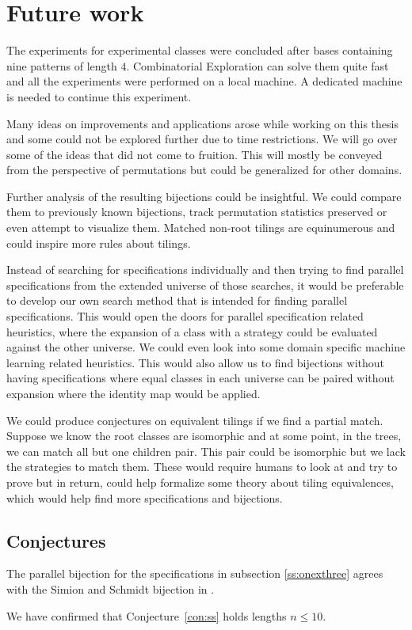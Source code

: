 \label{ch:conclusion}

\section{Future work}\label{s:fw}
The experiments for experimental classes were concluded after bases containing nine patterns of length $4$. Combinatorial Exploration can solve them quite fast and all the experiments were performed on a local machine. A dedicated machine is needed to continue this experiment.

Many ideas on improvements and applications arose while working on this thesis and some could not be explored further due to time restrictions. We will go over some of the ideas that did not come to fruition. This will mostly be conveyed from the perspective of permutations but could be generalized for other domains.

Further analysis of the resulting bijections could be insightful. We could compare them to previously known bijections, track permutation statistics preserved or even attempt to visualize them. Matched non-root tilings are equinumerous and could inspire more rules about tilings.

Instead of searching for specifications individually and then trying to find parallel specifications from the extended universe of those searches, it would be preferable to develop our own search method that is intended for finding parallel specifications. This would open the doors for parallel specification related heuristics, where the expansion of a class with a strategy could be evaluated against the other universe. We could even look into some domain specific machine learning related heuristics. This would also allow us to find bijections without having specifications where equal classes in each universe can be paired without expansion where the identity map would be applied.

We could produce conjectures on equivalent tilings if we find a partial match. Suppose we know the root classes are isomorphic and at some point, in the trees, we can match all but one children pair. This pair could be isomorphic but we lack the strategies to match them. These would require humans to look at and try to prove but in return, could help formalize some theory about tiling equivalences, which would help find more specifications and bijections.

\subsection{Conjectures}
\begin{conjecture}\label{con:ss}
The parallel bijection for the specifications in subsection \ref{ss:onexthree} agrees with the Simion and Schmidt bijection in \cite{simionandschmidt}.
\end{conjecture}
We have confirmed that Conjecture~\ref{con:ss} holds lengths $n \leq 10$.

